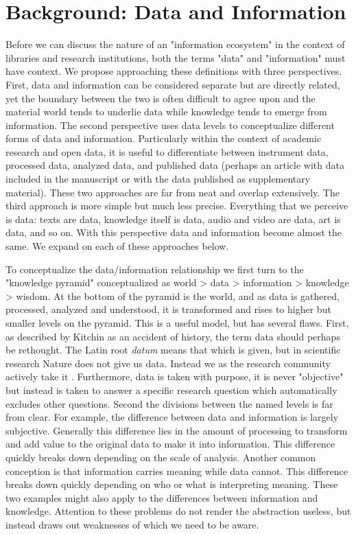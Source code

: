 \section{Background: Data and Information}

Before we can discuss the nature of an "information ecosystem" in the context of libraries and research institutions, both the terms "data" and "information" must have context. We propose approaching these definitions with three perspectives. First, data and information can be considered separate but are directly related, yet the boundary between the two is often difficult to agree upon and the material world tends to underlie data while knowledge tends to emerge from information. The second perspective uses data levels to conceptualize different forms of data and information. Particularly within the context of academic research and open data, it is useful to differentiate between instrument data, processed data, analyzed data, and published data (perhaps an article with data included in the manuscript or with the data published as supplementary material). These two approaches are far from neat and overlap extensively. The third approach is more simple but much less precise. Everything that we perceive is data: texts are data, knowledge itself is data, audio and video are data, art is data, and so on. With this perspective data and information become almost the same. We expand on each of these approaches below.

To conceptualize the data/information relationship we first turn to the "knowledge pyramid" conceptualized as world > data > information > knowledge > wisdom. At the bottom of the pyramid is the world, and as data is gathered, processed, analyzed and understood, it is transformed and rises to higher but smaller levels on the pyramid. This is a useful model, but has several flaws. First, as described by Kitchin as an accident of history, the term data should perhaps be rethought. The Latin root \textit{datum} means that which is given, but in scientific research Nature does not give us data. Instead we as the research community actively take it \cite{kitchin_2014}. Furthermore, data is taken with purpose, it is never "objective" but instead is taken to answer a specific research question which automatically excludes other questions. Second the divisions between the named levels is far from clear. For example, the difference between data and information is largely subjective. Generally this difference lies in the amount of processing to transform and add value to the original data to make it into information. This difference quickly breaks down depending on the scale of analysis. Another common conception is that information carries meaning while data cannot. This difference breaks down quickly depending on who or what is interpreting meaning. These two examples might also apply to the differences between information and knowledge. Attention to these problems do not render the abstraction useless, but instead draws out weaknesses of which we need to be aware.

